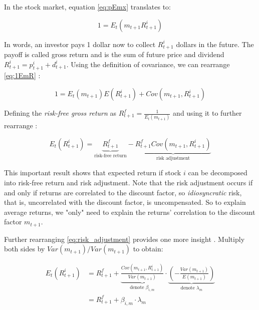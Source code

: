 	 	In the stock market, equation \ref{eq:pEmx} translates to:
	 	
	 	\begin{equation}
	 		1 = E_t(m_{t+1} R_{t+1}^i ) \label{eq:1EmR}
	 	\end{equation} 
	 	
	 	In words, an investor pays 1 dollar now to collect $R_{t+1}^i$ dollars in the future. The payoff is called gross return and is the sum of future price and dividend $R_{t+1}^i = p_{t+1}^i+ d_{t+1}^i$. 
	 	Using the definition of covariance, we can rearrange \ref{eq:1EmR} \citep{cochrane2009asset}:
	 	
	 	\begin{equation}
	 		1 = E_t(m_{t+1}) E(R_{t+1}^i) + Cov(m_{t+1},R_{t+1}^i) 
	 	\end{equation} 
 	
 		Defining the \textit{risk-free gross return} as $R_{t+1}^f=\frac{1}{E_t(m_{t+1})}$ and using it to further rearrange \citep{cochrane2009asset}:
 		
 		\begin{equation}
 			E_t(R_{t+1}^i) = \underbrace{R_{t+1}^f}_\text{risk-free return}  -  \underbrace{R_{t+1}^f Cov(m_{t+1},R_{t+1}^i)}_\text{risk adjustment} \label{eq:risk_adjustment}
 		\end{equation} 
 		
 		This important result shows that expected return if stock $i$ can be decomposed into risk-free return and risk adjustment. Note that the risk adjustment occurs if and only if returns are correlated to the discount factor, so \textit{idiosyncratic} risk, that is, uncorrelated with the discount factor, is uncompensated. So to explain average returns, we "only" need to explain the returns' correlation to the discount factor $m_{t+1}$. 
 		
 		Further rearranging \ref{eq:risk_adjustment} provides one more insight \citep{cochrane2009asset}. Multiply both sides by $Var(m_{t+1})/Var(m_{t+1})$ to obtain:
 		
 		\begin{align}
	 		E_t(R_{t+1}^i) 
	 		& = {R_{t+1}^f} + 
	 		\underbrace{
	 			\frac{Cov(m_{t+1},R_{t+1}^i)}{Var(m_{t+1})}
	 			}_\text{denote $\beta_{i,m}$} 
 			\cdot 
 			\underbrace{
 				\left(-\frac{Var(m_{t+1})}{E(m_{t+1})}\right)
 				}_\text{denote $\lambda_m$} \label{eq:factor_model} \\
 			& = {R_{t+1}^f} + \beta_{i,m} \cdot \lambda_m  \label{eq:beta_reprezentation}
 		\end{align} 
 		
